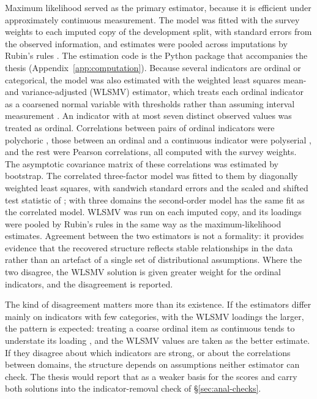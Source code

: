 Maximum likelihood served as the primary estimator, because it is efficient under approximately continuous measurement. The model was fitted with the survey weights to each imputed copy of the development split, with standard errors from the observed information, and estimates were pooled across imputations by Rubin's rules \citep{rubin_1987}. The estimation code is the Python package that accompanies the thesis (Appendix~\ref{app:computation}). Because several indicators are ordinal or categorical, the model was also estimated with the weighted least squares mean- and variance-adjusted (WLSMV) estimator, which treats each ordinal indicator as a coarsened normal variable with thresholds rather than assuming interval measurement \citep{muthen_1984,rhemtulla_2012}. An indicator with at most seven distinct observed values was treated as ordinal. Correlations between pairs of ordinal indicators were polychoric \citep{olsson_1979}, those between an ordinal and a continuous indicator were polyserial \citep{olsson_drasgow_dorans_1982}, and the rest were Pearson correlations, all computed with the survey weights. The asymptotic covariance matrix of these correlations was estimated by bootstrap. The correlated three-factor model was fitted to them by diagonally weighted least squares, with sandwich standard errors and the scaled and shifted test statistic of \citet{asparouhov_muthen_2010}; with three domains the second-order model has the same fit as the correlated model. WLSMV was run on each imputed copy, and its loadings were pooled by Rubin's rules in the same way as the maximum-likelihood estimates. Agreement between the two estimators is not a formality: it provides evidence that the recovered structure reflects stable relationships in the data rather than an artefact of a single set of distributional assumptions. Where the two disagree, the WLSMV solution is given greater weight for the ordinal indicators, and the disagreement is reported.

The kind of disagreement matters more than its existence. If the estimators differ mainly on indicators with few categories, with the WLSMV loadings the larger, the pattern is expected: treating a coarse ordinal item as continuous tends to understate its loading \citep{rhemtulla_2012}, and the WLSMV values are taken as the better estimate. If they disagree about which indicators are strong, or about the correlations between domains, the structure depends on assumptions neither estimator can check. The thesis would report that as a weaker basis for the scores and carry both solutions into the indicator-removal check of \S\ref{sec:anal-checks}.

